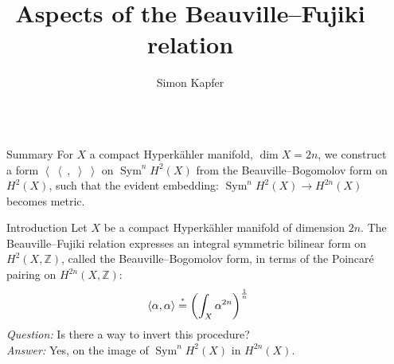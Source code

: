 \documentclass[final]{beamer}
\title{Aspects of the Beauville--Fujiki relation} %
\author{Simon Kapfer} %
\institute{Universit\'e de Poitiers} %
\newlength{\sepwid}
\newlength{\onecolwid}
\DeclareMathOperator{\Sym}{Sym}
\newcommand{\bra}{\left<\!\!\!\:\left<}
\newcommand{\ket}{\right>\!\!\!\:\right>}
\newcommand{\myeq}[1]{\mathrel{\overset{\makebox[0pt]{\text{\tiny #1}}}{=}}}
\newcommand{\stareq}{\myeq{*}}
\newcommand{\Z}{\mathbb{Z}}
\begin{document}

\setlength{\belowcaptionskip}{2ex} %
\setlength\belowdisplayshortskip{2ex} %

\begin{frame}[t] %

\begin{columns}[t] %

\begin{column}{\sepwid}\end{column} %

\begin{column}{\onecolwid} %

\begin{alertblock}{Summary}
For $X$ a compact Hyperk\"ahler manifold, $\dim X=2n$, we construct a form  $\bra\ ,\;\ket$ on $\Sym^nH^2(X)$ from the Beauville--Bogomolov form on $H^2(X)$, such that the
evident embedding: $\Sym^n\!H^2(X) \rightarrow H^{2n}(X)$ becomes metric.
\end{alertblock}




\begin{block}{Introduction}
Let $X$ be a compact Hyperk\"ahler manifold of dimension $2n$. The Beauville--Fujiki relation expresses an integral symmetric bilinear form on $H^2(X,\Z)$, called the Beauville--Bogomolov form, in terms of the Poincar\'e pairing on $H^{2n}(X,\Z)$:
$$
\left< \alpha,\alpha\right> \stareq \left(\int_X \alpha^{2n} \right) ^{\frac{1}{n}} \vspace{6pt}
$$
\emph{Question:} Is there a way to invert this procedure? \vspace{6pt}\\
\emph{Answer:} Yes, on the image of $\Sym^n\!H^2(X)$ in $ H^{2n}(X)$.\vspace{6pt}


\end{block}
\end{column}
\end{columns}
\end{frame}
\end{document}
